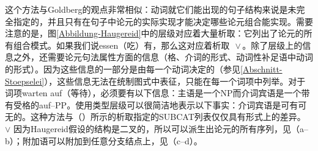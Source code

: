 \begin{exe}
\begin{xlist}[iv.]
\begin{exe}
\begin{xlist}[iv.]
这个方法与Goldberg的观点非常相似：动词就它们能出现的句子结构来说是未完全指定的，并且只有在句子中论元的实际实现才能决定哪些论元组合能实现。需要注意的是，图\ref{Abbildung-Haugereid}中的层级对应着大量析取：它列出了论元的所有组合模式。如果我们说essen（吃）有，那么这对应着析取\,~$\vee$\,。除了层级上的信息之外，还需要论元句法属性方面的信息（格、介词的形式、动词性补足语中动词的形式）。因为这些信息的一部分是由每一个动词决定的（参见\ref{Abschnitt-Stoepselei}），这些信息无法在统制图式中表征，只能在每一个词项中列举。对于词项warten auf（等待），必须要有以下信息：主语是一个NP而介词宾语是一个带有受格的auf--PP。使用类型层级可以很简洁地表示以下事实：介词宾语是可有可无的。这种方法与（）所示的析取指定的SUBCAT列表仅仅具有形式上的差异。
\ea
\subcat {} $\vee$ 
\z
%
因为Haugereid假设的结构是二叉的，所以可以派生出论元的所有序列，见（a--b）；附加语可以附加到任意分支结点上，见（c--d）。

\end{xlist}
\end{exe}
\end{xlist}
\end{exe}
